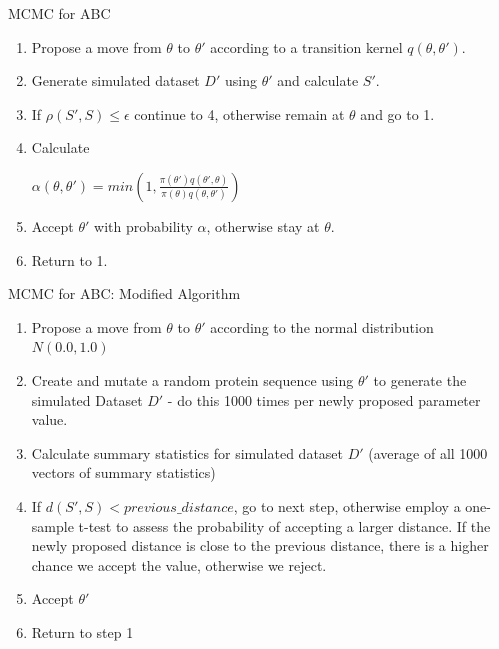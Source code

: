\documentclass{beamer}
\begin{document}
	\begin{frame}{MCMC for ABC}
		
		\begin{enumerate}
			\item Propose a move from $\theta$ to $\theta'$ according to a transition kernel $q(\theta,\theta')$.
			\item Generate simulated dataset $D'$ using $\theta'$ and calculate $S'$.
			\item If $\rho(S', S) \le \epsilon$ continue to 4, otherwise remain at $\theta$ and go to 1.
			\item Calculate \newline \begin{center}$\alpha(\theta, \theta') = min(1, \frac{\pi(\theta')q(\theta',\theta)}{\pi(\theta)q(\theta, \theta')})$ \end{center}
			\item Accept $\theta'$ with probability $\alpha$, otherwise stay at $\theta$.
			\item Return to 1.
		\end{enumerate}
	
	\end{frame}

	\begin{frame}{MCMC for ABC: Modified Algorithm}
	
		\begin{enumerate}
			\item Propose a move from $\theta$ to $\theta'$ according to the normal distribution $N(0.0,1.0)$
			\item Create and mutate a random protein sequence using $\theta'$ to generate the simulated Dataset $D'$ - do this 1000 times per newly proposed parameter value.
			\item Calculate summary statistics for simulated dataset $D'$ (average of all 1000 vectors of summary statistics)
			\item If $d(S',S) < previous\_distance$, go to next step, otherwise employ a one-sample t-test to assess the probability of accepting a larger distance. If the newly proposed distance is close to the previous distance, there is a higher chance we accept the value, otherwise we reject.
			\item Accept $\theta'$ 
			\item Return to step 1
		\end{enumerate}
	
	\end{frame}
\end{document}
